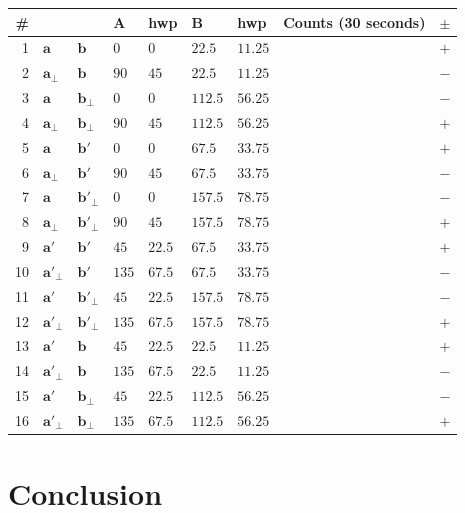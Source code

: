 \begin{center}
	\begin{tabular}{| r | l  l | l | l || l | l | l | l |}
	\toprule
	\# &  &  & A & hwp & B & hwp& Counts \;\; (30 seconds)& $\pm$\\ \toprule
	1&$\pmb{a}$&$\pmb{b}$&$0$&$0$&$22.5$&$11.25$& &$+$\\ \hline
	2&$\pmb{a}_\perp$&$\pmb{b}$&$90$&$45$&$22.5$&$11.25$& &$-$\\ \hline
	3&$\pmb{a}$&$\pmb{b}_\perp$&$0$&$0$&$112.5$&$56.25$& &$-$\\ \hline
	4&$\pmb{a}_\perp$&$\pmb{b}_\perp$&$90$&$45$&$112.5$&$56.25$& &$+$\\ \toprule
	5&$\pmb{a}$&$\pmb{b'}$&$0$&$0$&$67.5$&$33.75$& &$+$\\ \hline
	6&$\pmb{a}_\perp$&$\pmb{b'}$&$90$&$45$&$67.5$&$33.75$& &$-$\\ \hline
	7&$\pmb{a}$&$\pmb{b'}_\perp$&$0$&$0$&$157.5$&$78.75$& &$-$\\ \hline
	8&$\pmb{a}_\perp$&$\pmb{b'}_\perp$&$90$&$45$&$157.5$&$78.75$& &$+$\\ \toprule
	9&$\pmb{a'}$&$\pmb{b'}$&$45$&$22.5$&$67.5$&$33.75$& &$+$\\ \hline
	10&$\pmb{a'}_\perp$&$\pmb{b'}$&$135$&$67.5$&$67.5$&$33.75$& &$-$\\ \hline
	11&$\pmb{a'}$&$\pmb{b'}_\perp$&$45$&$22.5$&$157.5$&$78.75$& &$-$\\ \hline
	12&$\pmb{a'}_\perp$&$\pmb{b'}_\perp$&$135$&$67.5$&$157.5$&$78.75$& &$+$\\ \toprule
	13&$\pmb{a'}$&$\pmb{b}$&$45$&$22.5$&$22.5$&$11.25$& &$+$\\ \hline
	14&$\pmb{a'}_\perp$&$\pmb{b}$&$135$&$67.5$&$22.5$&$11.25$& &$-$\\ \hline
	15&$\pmb{a'}$&$\pmb{b}_\perp$&$45$&$22.5$&$112.5$&$56.25$& &$-$\\ \hline
	16&$\pmb{a'}_\perp$&$\pmb{b}_\perp$&$135$&$67.5$&$112.5$&$56.25$& &$+$\\ \toprule


\end{tabular}
\end{center}

\section*{Conclusion}


